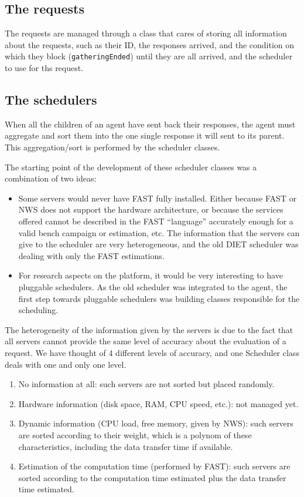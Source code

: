 \subsection{The requests}

The requests are managed through a class that cares of storing all information
about the requests, such as their ID, the responses arrived, and the condition
on which they block (\texttt{gatheringEnded}) until they are all arrived, and
the scheduler to use for ths request.



\subsection{The schedulers}

When all the children of an agent have sent back their responses, the agent must
aggregate and sort them into the one single response it will sent to its parent.
This aggregation/sort is performed by the scheduler classes.

The starting point of the development of these scheduler classes was a
combination of two ideas:
\begin{itemize}
\item Some servers would never have FAST fully installed. Either because FAST or
  NWS does not support the hardware architecture, or because the services
  offered cannot be described in the FAST ``language'' accurately enough for a
  valid bench campaign or estimation, etc. The information that the servers can
  give to the scheduler are very heterogeneous, and the old DIET scheduler was
  dealing with only the FAST estimations.
\item For research aspects on the platform, it would be very interesting to
  have pluggable schedulers. As the old scheduler was integrated to the agent,
  the first step towards pluggable schedulers was building classes responsible
  for the scheduling.
\end{itemize}

The heterogeneity of the information given by the servers is due to the fact
that all servers cannot provide the same level of accuracy about the evaluation
of a request. We have thought of 4 different levels of accuracy, and one
\textsf{Scheduler} class deals with one and only one level.
\begin{enumerate}
\item No information at all: such servers are not sorted but placed randomly.
\item Hardware information (disk space, RAM, CPU speed, etc.): not managed yet.
\item Dynamic information (CPU load, free memory, given by NWS): such servers
  are sorted according to their weight, which is a polynom of these
  characteristics, including the data transfer time if available.
\item Estimation of the computation time (performed by FAST): such servers
  are sorted according to the computation time estimated plus the data transfer
  time estimated.
\end{enumerate}

